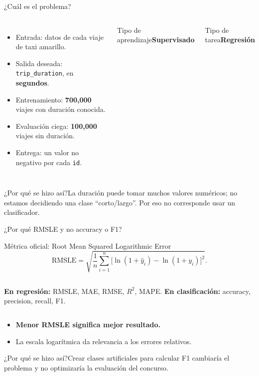 \documentclass[aspectratio=169,11pt]{beamer}
\newcommand{\clav}[1]{\textcolor{UNAMteal}{\textbf{#1}}}
\newcommand{\porq}[1]{\vspace{1.2mm}\begin{block}{¿Por qué se hizo así?}\small #1\end{block}}
\newcommand{\dato}[2]{\begin{block}{#1}\centering\Large\textbf{#2}\end{block}}
\begin{document}
\begin{frame}{¿Cuál es el problema?}
\begin{columns}[T]
    \begin{itemize}
      \item Entrada: datos de cada viaje de taxi amarillo.
      \item Salida deseada: \texttt{trip\_duration}, en \textbf{segundos}.
      \item Entrenamiento: \textbf{700,000} viajes con duración conocida.
      \item Evaluación ciega: \textbf{100,000} viajes sin duración.
      \item Entrega: un valor no negativo por cada \texttt{id}.
    \end{itemize}
    \dato{Tipo de aprendizaje}{Supervisado}
    \dato{Tipo de tarea}{Regresión}
\end{columns}
\porq{La duración puede tomar muchos valores numéricos; no estamos decidiendo una clase ``corto/largo''. Por eso no corresponde usar un clasificador.}
\end{frame}

\begin{frame}{¿Por qué RMSLE y no accuracy o F1?}
\begin{block}{Métrica oficial: Root Mean Squared Logarithmic Error}
\[
\mathrm{RMSLE}=\sqrt{\frac1n\sum_{i=1}^n\Big[\ln(1+\widehat y_i)-\ln(1+y_i)\Big]^2}.
\]
\end{block}
\begin{columns}[T]
  \textbf{En regresión:} RMSLE, MAE, RMSE, $R^2$, MAPE.
  \textbf{En clasificación:} accuracy, precision, recall, F1.
\end{columns}
\vspace{2mm}
\begin{itemize}
  \item \clav{Menor RMSLE significa mejor resultado.}
  \item La escala logarítmica da relevancia a los errores relativos.
\end{itemize}
\porq{Crear clases artificiales para calcular F1 cambiaría el problema y no optimizaría la evaluación del concurso.}
\end{frame}
\end{document}

